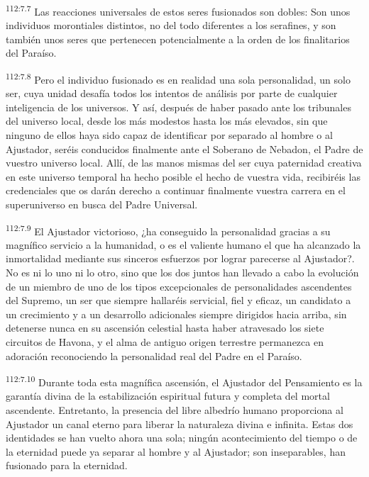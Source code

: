 \par
\textsuperscript{112:7.7} Las reacciones universales de estos seres fusionados son dobles: Son unos individuos morontiales distintos, no del todo diferentes a los serafines, y son también unos seres que pertenecen potencialmente a la orden de los finalitarios del Paraíso.

\par
\textsuperscript{112:7.8} Pero el individuo fusionado es en realidad una sola personalidad, un solo ser, cuya unidad desafía todos los intentos de análisis por parte de cualquier inteligencia de los universos. Y así, después de haber pasado ante los tribunales del universo local, desde los más modestos hasta los más elevados, sin que ninguno de ellos haya sido capaz de identificar por separado al hombre o al Ajustador, seréis conducidos finalmente ante el Soberano de Nebadon, el Padre de vuestro universo local. Allí, de las manos mismas del ser cuya paternidad creativa en este universo temporal ha hecho posible el hecho de vuestra vida, recibiréis las credenciales que os darán derecho a continuar finalmente vuestra carrera en el superuniverso en busca del Padre Universal.

\par
\textsuperscript{112:7.9} El Ajustador victorioso, ¿ha conseguido la personalidad gracias a su magnífico servicio a la humanidad, o es el valiente humano el que ha alcanzado la inmortalidad mediante sus sinceros esfuerzos por lograr parecerse al Ajustador?. No es ni lo uno ni lo otro, sino que los dos juntos han llevado a cabo la evolución de un miembro de uno de los tipos excepcionales de personalidades ascendentes del Supremo, un ser que siempre hallaréis servicial, fiel y eficaz, un candidato a un crecimiento y a un desarrollo adicionales siempre dirigidos hacia arriba, sin detenerse nunca en su ascensión celestial hasta haber atravesado los siete circuitos de Havona, y el alma de antiguo origen terrestre permanezca en adoración reconociendo la personalidad real del Padre en el Paraíso.

\par
\textsuperscript{112:7.10} Durante toda esta magnífica ascensión, el Ajustador del Pensamiento es la garantía divina de la estabilización espiritual futura y completa del mortal ascendente. Entretanto, la presencia del libre albedrío humano proporciona al Ajustador un canal eterno para liberar la naturaleza divina e infinita. Estas dos identidades se han vuelto ahora una sola; ningún acontecimiento del tiempo o de la eternidad puede ya separar al hombre y al Ajustador; son inseparables, han fusionado para la eternidad.

